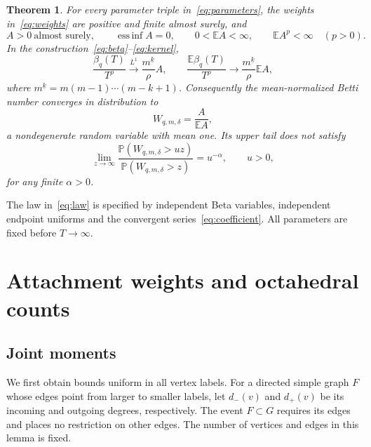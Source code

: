 \documentclass[11pt]{article}
\newtheorem{theorem}{Theorem}[section]
\theoremstyle{remark}\newtheorem{remark}[theorem]{Remark}
\DeclareMathOperator{\essinf}{ess\,inf}
\newcommand{\E}{\mathbb E}
\newcommand{\Prob}{\mathbb P}
\newcommand{\fall}[2]{#1^{\underline{#2}}}
\begin{document}
\begin{theorem}\label{thm:main}
For every parameter triple in~\eqref{eq:parameters}, the weights
in~\eqref{eq:weights} are positive and finite almost surely, and
\[
 A>0\ \text{almost surely},\qquad
 \essinf A=0,\qquad 0<\E A<\infty,\qquad
 \E A^p<\infty\quad (p>0).
\]
In the construction~\eqref{eq:beta}--\eqref{eq:kernel},
\begin{equation}\label{eq:betti-limit}
 \frac{\beta_q(T)}{T^\rho}
 \xrightarrow{L^1}\frac{\fall{m}{k}}{\rho}A,
 \qquad
 \frac{\E\beta_q(T)}{T^\rho}
 \longrightarrow\frac{\fall{m}{k}}{\rho}\E A,
\end{equation}
where $\fall{m}{k}=m(m-1)\cdots(m-k+1)$.
Consequently the mean-normalized Betti number converges in distribution to
\begin{equation}\label{eq:law}
 W_{q,m,\delta}=\frac{A}{\E A},
\end{equation}
a nondegenerate random variable with mean one. Its upper tail does not satisfy
\begin{equation}\label{eq:rv}
 \lim_{z\to\infty}\frac{\Prob(W_{q,m,\delta}>uz)}
 {\Prob(W_{q,m,\delta}>z)}=u^{-\alpha},\qquad u>0,
\end{equation}
for any finite $\alpha>0$.
\end{theorem}

The law in~\eqref{eq:law} is specified by independent Beta variables,
independent endpoint uniforms and the convergent series~\eqref{eq:coefficient}.
All parameters are fixed before $T\to\infty$.

\section{Attachment weights and octahedral counts}\label{sec:environment}
\subsection{Joint moments}
We first obtain bounds uniform in all vertex labels. For a directed simple
graph $F$ whose edges point from larger to smaller labels, let $d_-(v)$
and $d_+(v)$ be its incoming and outgoing degrees, respectively.
The event $F\subset G$ requires its edges and places no restriction on
other edges. The number of vertices and edges in this lemma is fixed.
\end{document}
